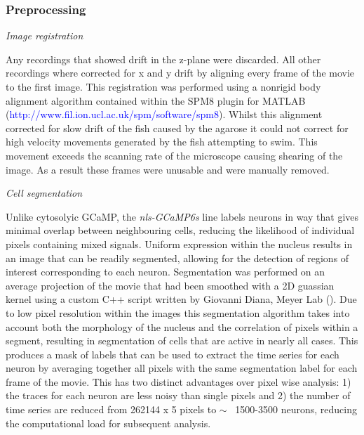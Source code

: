 \subsubsection{Preprocessing}
\newline
{\medium \textit{Image registration}\par}
Any recordings that showed drift in the z-plane were discarded. All other recordings where corrected for x and y drift by aligning every frame of the movie to the first image. This registration was performed using a nonrigid body alignment algorithm contained within the SPM8 plugin for MATLAB (\textcolor{blue}{http://www.fil.ion.ucl.ac.uk/spm/software/spm8}). Whilst this alignment corrected for slow drift of the fish caused by the agarose it could not correct for high velocity movements generated by the fish attempting to swim. This movement exceeds the
scanning rate of the microscope causing shearing of the image. As a result these frames were unusable and were manually removed.

\newline
{\medium \textit{Cell segmentation}\par}
Unlike cytosolyic GCaMP, the \emph{nls-GCaMP6s} line labels neurons in way that gives minimal overlap between neighbouring cells, reducing the likelihood of individual pixels containing mixed signals. Uniform expression within the nucleus results in an image that can be readily segmented, allowing for the detection of regions of interest corresponding to each neuron. Segmentation was performed on an average projection of the movie that had been smoothed with a 2D guassian kernel using a custom C++ script written by Giovanni Diana, Meyer Lab (\cite{Diana2019BayesianAssemblies}). Due to low pixel resolution within the images this segmentation algorithm takes into account both the morphology of the nucleus and the correlation of pixels within a segment, resulting in segmentation of cells that are active in nearly all cases. This produces a mask of labels that can be used to extract the time series for each neuron by averaging together all pixels with the same segmentation label for each frame of the movie. This has two distinct advantages over pixel wise analysis:
1) the traces for each neuron are less noisy than single pixels and 2) the number of
time series are reduced from 262144 x 5 pixels to  $\sim$ ~1500-3500 neurons, reducing the
computational load for subsequent analysis.

